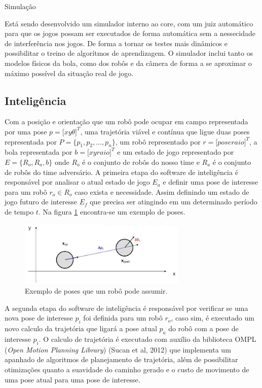 \documentclass[letterpaper, 10 pt, conference]{ieeeconf}  %
\begin{document}
Simulação

Está sendo desenvolvido um simulador interno ao core, com um juiz automático para que os jogos possam ser executados de forma automática sem a nessecidade de interferência nos jogos. De forma a tornar os testes mais dinâmicos e possibilitar o treino de algorítmos de aprendizagem.
O simulador inclui tanto os modelos físicos da bola, como dos robôs e da câmera de forma a se aproximar o máximo possível da situação real de jogo.

 \subsection{Inteligência}
Com a posição e orientação que um robô pode ocupar em campo representada por uma pose $p = [x$\hspace{0.25cm}$y$\hspace{0.25cm}$\theta]^T$, uma trajetória viável e contínua que ligue duas poses representada por $P = \{ p_1, p_2, ..., p_n \}$, um robô representado por $r = [pose$\hspace{0.25cm}$raio]^T$, a bola representada por $b = [x$\hspace{0.25cm}$y$\hspace{0.25cm}$raio]^T$ e um estado de jogo representado por $E = \{R_o, R_a, b\}$ onde $R_o$ é o conjunto de robôs do nosso time e $R_a$ é o conjunto de robôs do time adversário. A primeira etapa do software de inteligência é responsável por analisar o atual estado de jogo $E_a$ e definir uma pose de interesse para um robô $r_o \in R_o$ caso exista e necessidade. Assim definindo um estado de jogo futuro de interesse $E_f$ que precisa ser atingindo em um determinado período de tempo $t$. Na figura \ref{img:pose} encontra-se um exemplo de poses.
\begin{figure}[thpb]
	\centering
	\includegraphics[width=8cm]{img/pose}
	\caption{Exemplo de poses que um robô pode assumir.}
	\label{img:pose}
\end{figure}

A segunda etapa do software de inteligência é responsável por verificar se uma nova pose de interesse $p_i$ foi definida para um robô $r_o$, caso sim, é executado um novo calculo da trajetória que ligará a pose atual $p_a$ do robô com a pose de interesse $p_i$. O calculo de trajetória é executado com auxílio da biblioteca OMPL (\textit{Open Motion Planning Library}) (Sucan et al, 2012)\cite{ompl} que implementa um apanhado de algoritmos de planejamento de trajetória, além de possibilitar otimizações quanto a suavidade do caminho gerado e o custo de movimento de uma pose atual para uma pose de interesse.
\end{document}
